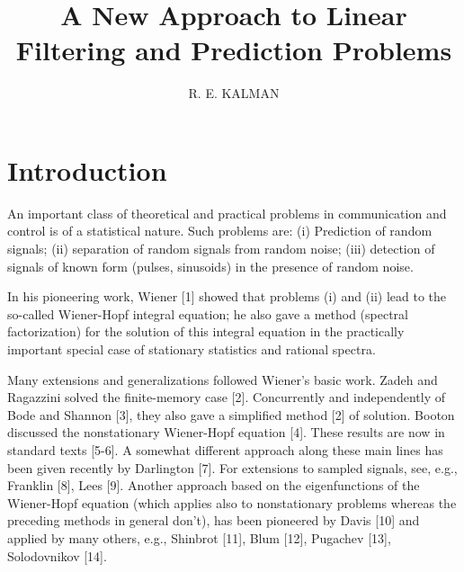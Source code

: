 \documentclass{article}
\begin{document}
\title{A New Approach to Linear Filtering and Prediction Problems}
\author{R. E. KALMAN}
\date{}
\maketitle
{}
\section{Introduction}
An important class of theoretical and practical problems in communication and control is of a statistical nature. Such problems are: (i) Prediction of random signals; (ii) separation of random signals from random noise; (iii) detection of signals of known form (pulses, sinusoids) in the presence of random noise.

In his pioneering work, Wiener [1] showed that problems (i) and (ii) lead to the so-called Wiener-Hopf integral equation; he also gave a method (spectral factorization) for the solution of this integral equation in the practically important special case of stationary statistics and rational spectra.

Many extensions and generalizations followed Wiener’s basic work. Zadeh and Ragazzini solved the finite-memory case [2]. Concurrently and independently of Bode and Shannon [3], they also gave a simplified method [2] of solution. Booton discussed the nonstationary Wiener-Hopf equation [4]. These results are now in standard texts [5-6]. A somewhat different approach along these main lines has been given recently by Darlington [7]. For extensions to sampled signals, see, e.g., Franklin [8], Lees [9]. Another approach based on the eigenfunctions of the Wiener-Hopf equation (which applies also to nonstationary problems whereas the preceding methods in general don’t), has been pioneered by Davis [10] and applied by many others, e.g., Shinbrot [11], Blum [12], Pugachev [13], Solodovnikov [14].
\end{document}
